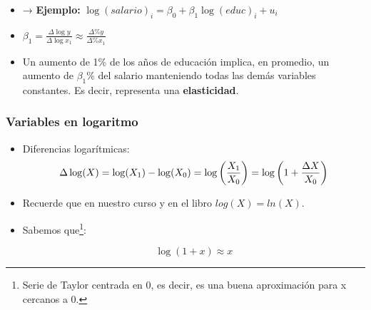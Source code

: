 \documentclass{beamer}
\begin{document}
\begin{frame}[shrink=10]
\begin{enumerate}
\begin{itemize}
            \item → \textbf{Ejemplo:} $\log(salario)_i = \beta_0 + \beta_1 \log(educ)_i + u_i$
            \item $\beta_1 = \frac{\Delta \log y}{\Delta \log x_1}\approx \frac{\Delta\% y}{ \Delta\% x_1}$
            \item Un aumento de 1\% de los años de educación implica, en promedio, un aumento de $\beta_1 \%$ del salario manteniendo todas las demás variables constantes. Es decir, representa una {\bf elasticidad}.
        \end{itemize}
    \end{enumerate}


\end{frame}

\begin{frame}
\frametitle{Variables en logaritmo}

\begin{itemize}
    \item Diferencias logarítmicas:
    \[
    \Delta \log(X)= \log(X_1)-\log(X_0)= \log\left (\frac{ X_1}{X_0}\right )=\log\left(1+{\Delta X\over X_0} \right)
    \]
    \item Recuerde que en nuestro curso y en el libro $log(X)=ln(X)$.
    \item Sabemos que\footnote{Serie de Taylor centrada en 0, es decir, es una buena aproximación para x cercanos a 0.}:

    \[
    \log(1+x) \approx x
    \]
    
\end{itemize}



\end{frame}
\end{document}
